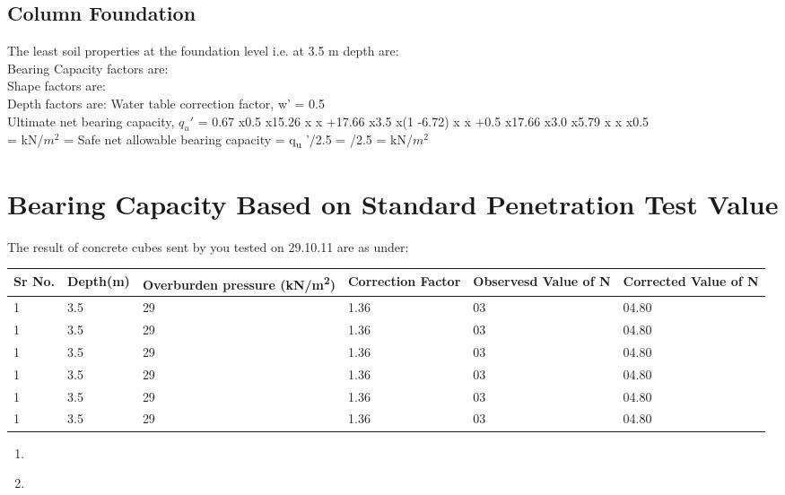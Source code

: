 \documentclass{soil12}
\begin{document}
\subsection{Column Foundation}
The least soil properties at the foundation level i.e. at 3.5 m depth are: \\
Bearing Capacity factors are:\\
Shape factors are:\\
Depth factors are:
Water table correction factor, w' = 0.5 \\
Ultimate net bearing capacity, $q_u'$ = 0.67 x0.5 x15.26 x x +17.66 x3.5 x(1 -6.72) x x 
+0.5 x17.66 x3.0 x5.79 x x x0.5\\
= kN/$m^2$ = Safe net allowable bearing capacity = q\textsubscript{u} '/2.5 = /2.5 = kN/$m^2$
\section{Bearing Capacity Based on Standard Penetration Test Value}

\begin{center}
The result of concrete cubes sent by you tested on 29.10.11 are as under:
\end{center}
\hspace{1.1cm}
\begin{tabularx}{\textwidth}{|*{6}{l|}}
\hline
 \multicolumn{1}{|m{1cm}|}{Sr No.} &\multicolumn{1}{m{2cm}|}{Depth(m)} &\multicolumn{1}{m{2.5cm}|}{Overburden pressure (kN/m\textsuperscript{2})}
&\multicolumn{1}{m{2cm}|}{Correction Factor} &\multicolumn{1}{m{2cm}|}{Observesd Value of N} &\multicolumn{1}{m{2.9cm}|}{Corrected Value of N}\\
\hline
1 &3.5 &29 &1.36 &03 &04.80\\
\hline
1 &3.5 &29 &1.36 &03 &04.80\\
\hline
1 &3.5 &29 &1.36 &03 &04.80\\
\hline
1 &3.5 &29 &1.36 &03 &04.80\\
\hline
1 &3.5 &29 &1.36 &03 &04.80\\
\hline
1 &3.5 &29 &1.36 &03 &04.80\\
\hline
\end{tabularx}

\begin{enumerate}
\item{}
\item{
}
\end{enumerate}
\clearpage
\end{document}
